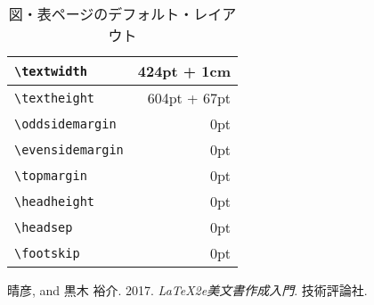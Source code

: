 \documentclass[
  sotsuron]{kuee}
\begin{document}
\begin{table}
  \caption{図・表ページのデフォルト・レイアウト}\label{tab:fig}
  \begin{center}
    \begin{tabular}{|l|r|}
      \hline
      \verb+\textwidth+ & 424pt + 1cm  \\ \hline
      \verb+\textheight+ & 604pt + 67pt \\ \hline
      \verb+\oddsidemargin+ & 0pt          \\ \hline
      \verb+\evensidemargin+ & 0pt          \\ \hline
      \verb+\topmargin+ & 0pt          \\ \hline
      \verb+\headheight+ & 0pt          \\ \hline
      \verb+\headsep+ & 0pt          \\ \hline
      \verb+\footskip+ & 0pt          \\ \hline
    \end{tabular}
  \end{center}
\end{table}

\hypertarget{refs}{}
\leavevmode\hypertarget{ref-GuideBook}{}%
晴彦, and 黒木 裕介. 2017. \emph{LaTeX2e美文書作成入門}. 技術評論社.
\end{document}
